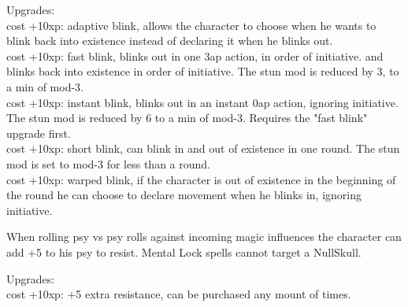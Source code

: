 Upgrades: \\
cost +10xp: adaptive blink, allows the character to choose when he wants to blink back into existence instead of declaring it when he blinks out. \\
cost +10xp: fast blink, blinks out in one 3ap action, in order of initiative.
and blinks back into existence in order of initiative. The stun mod is reduced by 3, to a min of mod-3. \\
cost +10xp: instant blink, blinks out in an instant 0ap action, ignoring initiative. The stun mod is reduced by 6 to a min of mod-3. Requires the "fast blink" upgrade first. \\
cost +10xp: short blink, can blink in and out of existence in one round. The stun mod is set to mod-3 for less than a round. \\
cost +10xp: warped blink, if the character is out of existence in the beginning of the round he can choose to declare movement when he blinks in, ignoring initiative.


 When rolling psy vs psy rolls against incoming magic influences the character can add +5 to his psy to resist. Mental Lock spells cannot target a NullSkull.

Upgrades:\\
cost +10xp: +5 extra resistance, can be purchased any mount of times.


